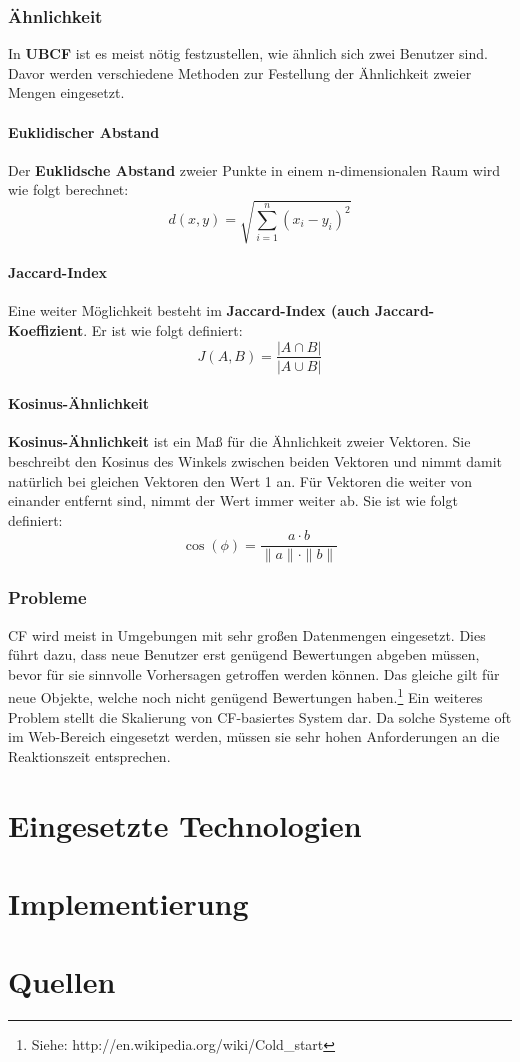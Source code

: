 \documentclass[german,a4paper]{article}
\begin{document}
\subsubsection{Ähnlichkeit}
In \textbf{UBCF} ist es meist nötig festzustellen, wie ähnlich sich zwei Benutzer sind. Davor werden verschiedene Methoden zur Festellung der Ähnlichkeit zweier Mengen eingesetzt.
\paragraph{Euklidischer Abstand}
Der \textbf{Euklidsche Abstand} zweier Punkte in einem n-dimensionalen Raum wird wie folgt berechnet:
\begin{equation}
d(x,y) = \sqrt{\displaystyle\sum_{i=1}^{n} (x_i - y_i)^2}
\end{equation}
\paragraph{Jaccard-Index}
Eine weiter Möglichkeit besteht im \textbf{Jaccard-Index (auch Jaccard-Koeffizient}. Er ist wie folgt definiert:
\begin{equation}
J(A,B) = \frac{|A \cap B|}{|A \cup B|}
\end{equation}
\paragraph{Kosinus-Ähnlichkeit}
\textbf{Kosinus-Ähnlichkeit} ist ein Maß für die Ähnlichkeit zweier Vektoren. Sie beschreibt den Kosinus des Winkels zwischen beiden Vektoren und nimmt damit natürlich bei gleichen Vektoren den Wert 1 an. Für Vektoren die weiter von einander entfernt sind, nimmt der Wert immer weiter ab. Sie ist wie folgt definiert:
\begin{equation}
\cos(\phi) = \frac{a \cdot b}{\|a\| \cdot \|b\|} 
\end{equation}
\subsubsection{Probleme}
CF wird meist in Umgebungen mit sehr großen Datenmengen eingesetzt. Dies führt dazu, dass neue Benutzer erst genügend Bewertungen abgeben müssen, bevor für sie sinnvolle Vorhersagen getroffen werden können. Das gleiche gilt für neue Objekte, welche noch nicht genügend Bewertungen haben.\footnote{Siehe: http://en.wikipedia.org/wiki/Cold\_start} Ein weiteres Problem stellt die Skalierung von CF-basiertes System dar. Da solche Systeme oft im Web-Bereich eingesetzt werden, müssen sie sehr hohen Anforderungen an die Reaktionszeit entsprechen.
\section{Eingesetzte Technologien}
\section{Implementierung}
\section{Quellen}
\end{document}

